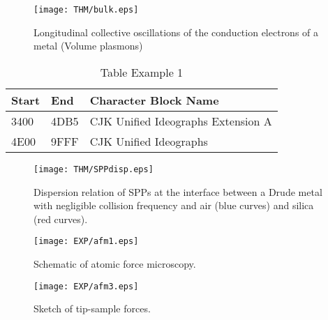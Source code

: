 \chapter*{}  %

\renewcommand{\thefigure}{\arabic{chapter}.\arabic{figure}} 
\renewcommand{\thetable}{\arabic{chapter}.\arabic{table}} 
\setcounter{chapter}{3}%
\setcounter{figure}{1}  %
\setcounter{table}{1}  %

\begin{figure}[!]
\centering
\texttt{[image: THM/bulk.eps]}
\caption{\label{fig:bulk}Longitudinal collective oscillations of the conduction electrons of a metal (Volume plasmons)}
\end{figure}

\begin{table}[!]\begin{center}
\caption{Table Example 1}
\begin{tabularx}{8cm}{llX}
\hline
Start & End  & Character Block Name \\
\hline
3400  & 4DB5 & CJK Unified Ideographs Extension A \\
4E00  & 9FFF & CJK Unified Ideographs \\
\hline
\end{tabularx}
 \end{center}\end{table}
 
\begin{figure}[!]
\centering
\texttt{[image: THM/SPPdisp.eps]}
\caption{\label{fig:SPPdisp}Dispersion relation of SPPs at the interface between a Drude metal with negligible collision frequency and air (blue curves) and silica (red curves).}
\end{figure}

\setcounter{chapter}{4}  %
\setcounter{figure}{1}  %

\begin{figure}[!]
\centering
\texttt{[image: EXP/afm1.eps]}
\caption{\label{fig:afm1}Schematic of atomic force microscopy.}
\end{figure}

\begin{figure}[!]
\centering
\texttt{[image: EXP/afm3.eps]}
\caption{\label{fig:afm3}Sketch of tip-sample forces.}
\end{figure}

